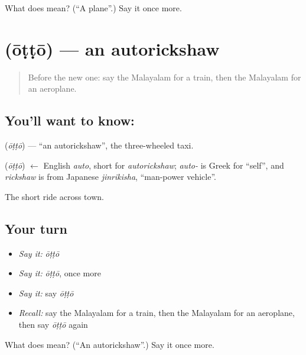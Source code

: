 \begin{tcolorbox}[breakable,colback=teal!4,colframe=teal!35!black,title={Before you move on}]
What does  mean? (\textquotedblleft{}A plane\textquotedblright{}.) Say it once more.
\end{tcolorbox}
\section[\texorpdfstring{\ml{ഓട്ടോ} (ōṭṭō)}{ഓട്ടോ (ōṭṭō)}]{ (ōṭṭō) — an autorickshaw}

\label{lesson:ML-C137-auto}



\begin{quote}
Before the new one: say the Malayalam for a train, then the Malayalam for an aeroplane.
\end{quote}

\subsection*{You'll want to know: }
\textbf{} (\emph{ōṭṭō}) — \textquotedblleft{}an autorickshaw\textquotedblright{}, the three-wheeled taxi.

\begin{cousinweb}
\textbf{} (\emph{ōṭṭō}) $\leftarrow$ English \emph{auto}, short for \emph{autorickshaw}; \emph{auto-} is Greek for \textquotedblleft{}self\textquotedblright{}, and \emph{rickshaw} is from Japanese \emph{jinrikisha}, \textquotedblleft{}man-power vehicle\textquotedblright{}.
\end{cousinweb}

\begin{grammarlens}[title={What you've built}]
The short ride across town.
\end{grammarlens}

\subsection*{Your turn}
\begin{itemize}
\raggedright
  \item \emph{Say it:} \emph{ōṭṭō}
  \item \emph{Say it:} \emph{ōṭṭō}, once more
  \item \emph{Say it:} say \emph{ōṭṭō}
  \item \emph{Recall:} say the Malayalam for a train, then the Malayalam for an aeroplane, then say \emph{ōṭṭō} again
\end{itemize}

\begin{tcolorbox}[breakable,colback=teal!4,colframe=teal!35!black,title={Before you move on}]
What does  mean? (\textquotedblleft{}An autorickshaw\textquotedblright{}.) Say it once more.
\end{tcolorbox}
